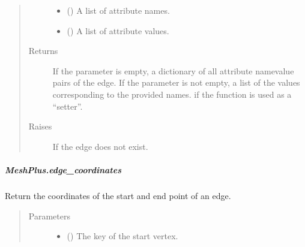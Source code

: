\documentclass[letterpaper,10pt,english]{sphinxmanual}
\begin{document}
\begin{fulllineitems}
\begin{fulllineitems}
\begin{quote}
\begin{description}
\begin{itemize}
\item {} 
 () \textendash{} A list of attribute names.

\item {} 
 () \textendash{} A list of attribute values.

\end{itemize}

\item[{Returns}] \leavevmode
{} \textendash{} If the parameter  is empty,
a dictionary of all attribute name\sphinxhyphen{}value pairs of the edge.
If the parameter  is not empty,
a list of the values corresponding to the provided names.
 if the function is used as a “setter”.

\item[{Raises}] \leavevmode
{} \textendash{} If the edge does not exist.

\end{description}\end{quote}

\end{fulllineitems}



\subparagraph{MeshPlus.edge\_coordinates}
\label{\detokenize{api/generated/directional_clustering.mesh.MeshPlus.edge_coordinates:meshplus-edge-coordinates}}\label{\detokenize{api/generated/directional_clustering.mesh.MeshPlus.edge_coordinates::doc}}

\begin{fulllineitems}
\label{\detokenize{api/generated/directional_clustering.mesh.MeshPlus.edge_coordinates:directional_clustering.mesh.MeshPlus.edge_coordinates}}
Return the coordinates of the start and end point of an edge.
\begin{quote}\begin{description}
\item[{Parameters}] \leavevmode\begin{itemize}
\item {} 
 () \textendash{} The key of the start vertex.


\end{itemize}
\end{description}
\end{quote}
\end{fulllineitems}
\end{fulllineitems}
\end{document}
